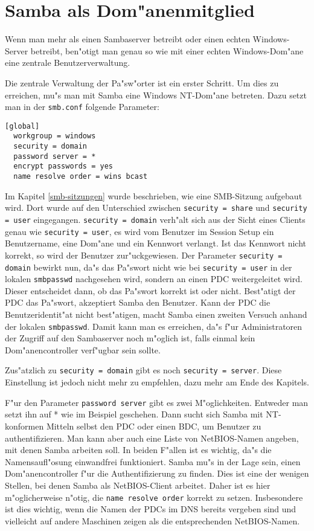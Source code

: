 \documentclass{scrartcl}\usepackage{pslatex}\typearea{12}
\newcommand{\param}{\texttt}
\newcommand{\dateistyle}{\texttt}
\begin{document}
\section{Samba als Dom"anenmitglied}
\label{domain-member}
Wenn man mehr als einen Sambaserver betreibt oder einen echten Windows-Server
betreibt, ben"otigt man genau so wie mit einer echten Windows-Dom"ane eine
zentrale Benutzerverwaltung.

Die zentrale Verwaltung der Pa"sw"orter ist ein erster Schritt. Um dies zu
erreichen, mu"s man mit Samba eine Windows NT-Dom"ane betreten.  Dazu setzt
man in der \dateistyle{smb.conf} folgende Parameter:

\begin{verbatim}
[global]
  workgroup = windows
  security = domain
  password server = *
  encrypt passwords = yes
  name resolve order = wins bcast
\end{verbatim}

Im Kapitel \ref{smb-sitzungen} wurde beschrieben, wie eine SMB-Sitzung
aufgebaut wird. Dort wurde auf den Unterschied zwischen \param{security
= share} und \param{security = user} eingegangen. \param{security = domain}
verh"alt sich aus der Sicht eines Clients genau wie \param{security = user},
es wird vom Benutzer im Session
Setup ein Benutzername, eine Dom"ane und ein Kennwort verlangt. Ist das
Kennwort nicht korrekt, so wird der Benutzer zur"uckgewiesen.  Der Parameter
\param{security = domain} bewirkt nun, da"s das Pa"swort nicht wie bei
\param{security = user} in der lokalen \dateistyle{smbpasswd} nachgesehen
wird, sondern an einen PDC weitergeleitet wird. Dieser entscheidet dann, ob
das Pa"swort korrekt ist oder nicht. Best"atigt der PDC das Pa"swort,
akzeptiert Samba den Benutzer. Kann der PDC die Benutzeridentit"at nicht
best"atigen, macht Samba einen zweiten Versuch anhand der lokalen
\dateistyle{smbpasswd}. Damit kann man es erreichen, da"s f"ur Administratoren
der Zugriff auf den Sambaserver noch m"oglich ist, falls einmal kein
Dom"anencontroller verf"ugbar sein sollte.

Zus"atzlich zu \param{security = domain} gibt es noch
\param{security = server}. Diese Einstellung ist jedoch nicht mehr zu
empfehlen, dazu mehr am Ende des Kapitels.

F"ur den Parameter \param{password server} gibt es zwei
M"oglichkeiten.  Entweder man setzt ihn auf * wie im Beispiel
geschehen. Dann sucht sich Samba mit NT-konformen Mitteln selbst den
PDC oder einen BDC, um Benutzer zu authentifizieren. Man kann aber
auch eine Liste von NetBIOS-Namen angeben, mit denen Samba arbeiten
soll. In beiden F"allen ist es wichtig, da"s die Namensaufl"osung
einwandfrei funktioniert. Samba mu"s in der Lage sein, einen
Dom"anencontroller f"ur die Authentifizierung zu finden. Dies ist eine
der wenigen Stellen, bei denen Samba als NetBIOS-Client arbeitet.
Daher ist es hier m"oglicherweise n"otig, die \param{name resolve
  order} korrekt zu setzen. Insbesondere ist dies wichtig, wenn die
Namen der PDCs im DNS bereits vergeben sind und vielleicht auf andere
Maschinen zeigen als die entsprechenden NetBIOS-Namen.
\end{document}
